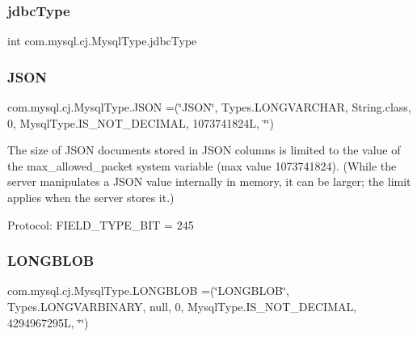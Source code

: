 \mbox{\label{enumcom_1_1mysql_1_1cj_1_1_mysql_type_aca13b73fe3014af5bc1c568024fd1063}} 
\subsubsection{\texorpdfstring{jdbc\+Type}{jdbcType}}
{\footnotesize\ttfamily int com.\+mysql.\+cj.\+Mysql\+Type.\+jdbc\+Type\hspace{0.3cm}{\ttfamily [protected]}}

\mbox{\label{enumcom_1_1mysql_1_1cj_1_1_mysql_type_a876e47530339c8cb791613d5a0d04f63}} 
\subsubsection{\texorpdfstring{J\+S\+ON}{JSON}}
{\footnotesize\ttfamily com.\+mysql.\+cj.\+Mysql\+Type.\+J\+S\+ON =(\char`\"{}J\+S\+ON\char`\"{}, Types.\+L\+O\+N\+G\+V\+A\+R\+C\+H\+AR, String.\+class, 0, Mysql\+Type.\+I\+S\+\_\+\+N\+O\+T\+\_\+\+D\+E\+C\+I\+M\+AL, 1073741824\+L, \char`\"{}\char`\"{})}

The size of J\+S\+ON documents stored in J\+S\+ON columns is limited to the value of the max\+\_\+allowed\+\_\+packet system variable (max value 1073741824). (While the server manipulates a J\+S\+ON value internally in memory, it can be larger; the limit applies when the server stores it.)

Protocol\+: F\+I\+E\+L\+D\+\_\+\+T\+Y\+P\+E\+\_\+\+B\+IT = 245 \mbox{\label{enumcom_1_1mysql_1_1cj_1_1_mysql_type_ae25524b95c3afb1577b4e86a9b1f9fca}} 
\subsubsection{\texorpdfstring{L\+O\+N\+G\+B\+L\+OB}{LONGBLOB}}
{\footnotesize\ttfamily com.\+mysql.\+cj.\+Mysql\+Type.\+L\+O\+N\+G\+B\+L\+OB =(\char`\"{}L\+O\+N\+G\+B\+L\+OB\char`\"{}, Types.\+L\+O\+N\+G\+V\+A\+R\+B\+I\+N\+A\+RY, null, 0, Mysql\+Type.\+I\+S\+\_\+\+N\+O\+T\+\_\+\+D\+E\+C\+I\+M\+AL, 4294967295\+L, \char`\"{}\char`\"{})}

